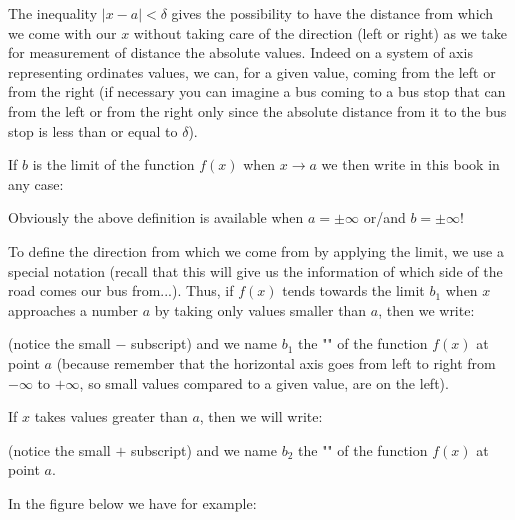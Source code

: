 	The inequality $|x-a|<\delta$ gives the possibility to have the distance from which we come with our $x$ without taking care of the direction (left or right) as we take for measurement of distance the absolute values. Indeed on a system of axis representing ordinates values, we can, for a given value, coming from the left or from the right (if necessary you can imagine a bus coming to a bus stop that can from the left or from the right only since the absolute distance from it to the bus stop is less than or equal to $\delta$).
	
	If $b$ is the limit of the function $f (x)$ when $x\rightarrow a$ we then write in this book in any case:
	
	Obviously the above definition is available when $a=\pm \infty$ or/and $b=\pm \infty$!	
	
	To define the direction from which we come from by applying the limit, we use a special notation (recall that this will give us the information of which side of the road comes our bus from...). Thus, if $f (x)$ tends towards the limit $b_1$ when $x$ approaches a number $a$ by taking only values smaller than $a$, then we write:
	
	(notice the small $-$ subscript) and we name $b_1$ the "" of the function $f (x)$ at point $a$ (because remember that the horizontal axis goes from left to right from $-\infty$ to $+\infty$, so small values compared to a given value, are on the left).
	
	If $x$ takes values greater than $a$, then we will write:
	
	(notice the small $+$ subscript) and we name $b_2$ the "" of the function $f (x)$ at point $a$.
	
	In the figure below we have for example:
	
